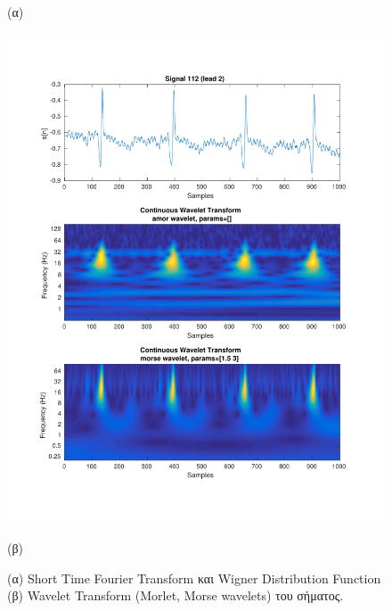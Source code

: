\documentclass[11pt,a4paper]{article}
\begin{document}
\begin{figure}[H]
\begin{minipage}{0.48\textwidth}
	(α)
\end{minipage}
\begin{minipage}{0.48\textwidth}
	\centering
	\includegraphics[width=\textwidth]{fig/112l2_cwt.pdf}
	
	(β)
\end{minipage}
\vfill
\caption{(α) Short Time Fourier Transform και Wigner Distribution Function (β) Wavelet Transform (Morlet, Morse wavelets) του σήματος.}
\label{fig:112l2_stft_wdf_wt}
\end{figure}
\end{document}

